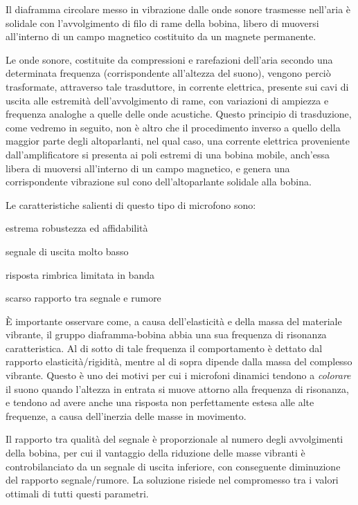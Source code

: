 \begin{refsection}

Il diaframma circolare messo in vibrazione dalle onde sonore trasmesse nell’aria
è solidale con l'avvolgimento di filo di rame della bobina, libero di muoversi
all’interno di un campo magnetico costituito da un magnete permanente.

Le onde sonore, costituite da compressioni e rarefazioni dell’aria secondo una
determinata frequenza (corrispondente all’altezza del suono), vengono perciò
trasformate, attraverso tale trasduttore, in corrente elettrica, presente sui
cavi di uscita alle estremità dell’avvolgimento di rame, con variazioni di
ampiezza e frequenza analoghe a quelle delle onde acustiche. Questo
principio di trasduzione, come vedremo in seguito, non è altro che il
procedimento inverso a quello della maggior parte degli altoparlanti, nel qual
caso, una corrente elettrica proveniente dall’amplificatore si presenta ai
poli estremi di una bobina mobile, anch’essa libera di muoversi all’interno di
un campo magnetico, e genera una corrispondente vibrazione sul cono
dell’altoparlante solidale alla bobina.

Le caratteristiche salienti di questo tipo di microfono sono:

\begin{compactitem}
  \item estrema robustezza ed affidabilità
  \item segnale di uscita molto basso
  \item risposta rimbrica limitata in banda
  \item scarso rapporto tra segnale e rumore
\end{compactitem}

È importante osservare come, a causa dell’elasticità e della massa del materiale
vibrante, il gruppo diaframma-bobina abbia una sua frequenza di risonanza
caratteristica. Al di sotto di tale frequenza il comportamento è dettato dal
rapporto elasticità/rigidità, mentre al di sopra dipende dalla massa del
complesso vibrante. Questo è uno dei motivi per cui i microfoni dinamici
tendono a \emph{colorare} il suono quando l'altezza in entrata si muove attorno
alla frequenza di risonanza, e tendono ad avere anche una risposta non perfettamente
estesa alle alte frequenze, a causa dell’inerzia delle masse in movimento.

Il rapporto tra qualità del segnale è proporzionale al numero degli avvolgimenti
della bobina, per cui il vantaggio della riduzione delle masse vibranti è
controbilanciato da un segnale di uscita inferiore, con conseguente diminuzione
del rapporto segnale/rumore. La soluzione risiede nel compromesso tra i valori
ottimali di tutti questi parametri.


\end{refsection}
